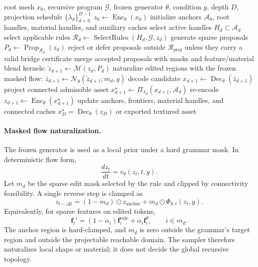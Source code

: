 \begin{algorithm}[t]
\caption{Recursive Sparse-Latent Program Execution}
\label{alg:rslg-execution-draft}
\begin{algorithmic}[1]
\REQUIRE root mesh \(x_0\), recursive program \(\mathcal G\), frozen generator
\(\theta\), condition \(y\), depth \(D\), projection schedule
\(\{\lambda_d\}_{d=0}^{D-1}\)
\STATE \(z_0\leftarrow \operatorname{Enc}_\theta(x_0)\)
\STATE initialize anchors \(\mathcal A_0\), root handles, material handles, and
auxiliary caches
  \STATE select active handles \(H_d\subset\mathcal A_d\)
  \STATE select applicable rules \(\mathcal R_d\leftarrow
  \operatorname{SelectRules}(H_d,\mathcal G,z_d)\)
  \STATE generate sparse proposals
  \(P_d\leftarrow \operatorname{Prop}_{\mathcal R_d}(z_d)\)
  \STATE reject or defer proposals outside \(\mathcal R_{\mathrm{proj}}\) unless
  they carry a valid bridge certificate
  \STATE merge accepted proposals with masks and feature/material blend kernels:
  \(\tilde z_{d+1}\leftarrow\mathcal M(z_d,P_d)\)
  \STATE naturalize edited regions with the frozen masked flow:
  \(\bar z_{d+1}\leftarrow\mathcal N_\theta(\tilde z_{d+1};m_d,y)\)
  \STATE decode candidate \(x_{d+1}\leftarrow
  \operatorname{Dec}_\theta(\bar z_{d+1})\)
  \STATE project connected admissible asset
  \(x_{d+1}^{\star}\leftarrow
  \Pi_{\lambda_d}(x_{d+1},\mathcal A_d)\)
  \STATE re-encode \(z_{d+1}\leftarrow
  \operatorname{Enc}_\theta(x_{d+1}^{\star})\)
  \STATE update anchors, frontiers, material handles, and connected caches
\ENDFOR
\RETURN \(x_D^\star=\operatorname{Dec}_\theta(z_D)\) or exported textured asset
\end{algorithmic}
\end{algorithm}

\paragraph{Masked flow naturalization.}
The frozen generator is used as a local prior under a hard grammar mask. In
deterministic flow form,
\begin{equation}
\frac{d z_t}{dt}=v_\theta(z_t,t,y).
\end{equation}
Let \(m_d\) be the sparse edit mask selected by the rule and clipped by
connectivity feasibility. A single reverse step is clamped as
\begin{equation}
z_{t-\Delta t}=
(1-m_d)\odot z_{\mathrm{anchor}}
+m_d\odot\Phi_{\theta,t}(z_t,y).
\label{eq:masked-flow-clamp-draft}
\end{equation}
Equivalently, for sparse features on edited tokens,
\begin{equation}
\mathbf f_i'=
(1-\alpha_i)\mathbf f_i^{\mathrm{rule}}
+\alpha_i\mathbf f_i^{\theta},
\qquad i\in m_d.
\end{equation}
The anchor region is hard-clamped, and \(m_d\) is zero outside the grammar's
target region and outside the projectable reachable domain. The sampler
therefore naturalizes local shape or material; it does not decide the global
recursive topology.

